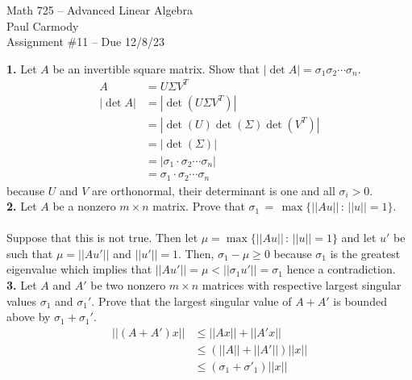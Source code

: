 \documentclass[11pt]{amsart}
\theoremstyle{definition}  %
\begin{document}
\begin{center}
\Large{Math 725 -- Advanced Linear Algebra}\\
\large{Paul Carmody}\\
Assignment \#11 -- Due 12/8/23
\end{center}
\vskip 1.0cm


\noindent
{\bf 1.} Let $A$ be an invertible square matrix.  Show that $|\det A| = \sigma_1 \sigma_2 \cdots \sigma_n$. 
\begin{align*}
	A &= U \Sigma V^T \\
	|\det A| &= |\det(U \Sigma V^T)|\\
	&= |\det(U)\det( \Sigma)\det (V^T)| \\
	&= |\det(\Sigma)| \\
	&= |\sigma_1\cdot\sigma_2\cdots\sigma_n| \\
	&= \sigma_1\cdot\sigma_2\cdots\sigma_n 
\end{align*}because $U$ and $V$ are orthonormal, their determinant is one and all $\sigma_i>0$.
\\


\vskip 0.1cm
\noindent
{\bf 2.}  Let $A$ be a nonzero $m \times n$ matrix. Prove that $\sigma_1 \, = \, \max \{|| Au || \, : \, || u || = 1\}$. \\ 
\\
Suppose that this is not true.  Then let $\mu = \max \{|| Au || \, : \, || u || = 1\}$ and let $u'$ be such that $\mu = ||Au'||$ and $||u'|| = 1$.  Then, $\sigma_1-\mu \ge 0$ because $\sigma_1$ is the greatest eigenvalue which implies that $||Au'|| = \mu < ||\sigma_1 u'|| = \sigma_1$ hence a contradiction.\\

\vskip 0.1cm
\noindent
{\bf 3.}  Let $A$ and $A'$ be two nonzero $m \times n$ matrices with respective largest singular values $\sigma_1$ and 
$\sigma_1'$. Prove that the largest singular value of $A + A'$ is bounded above by $\sigma_1 + \sigma_1'$. 
\begin{align*}
	||(A+A')x|| &\le ||Ax||+||A'x||\\
	&\le (||A||+||A'||)||x|| \\
	&\le (\sigma_1 + \sigma'_1)||x||
\end{align*}
 
\end{document}
